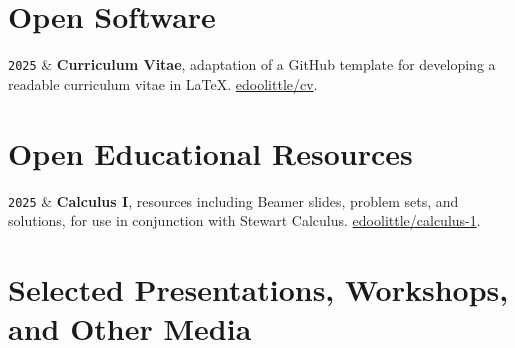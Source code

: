 \documentclass[9pt,a4paper]{article}
\newcommand{\Year}[1]{\fontsize{10pt}{0}\selectfont \texttt{#1}}
\newcommand{\GitHub}[1]{\faGithub{} \href{https://github.com/#1}{#1}}
\begin{document}
\section{Open Software}

\begin{EntriesTableYear}
  \Year{2025} & \textbf{Curriculum Vitae}, adaptation of a GitHub
  template for developing a readable curriculum vitae in \LaTeX.
  \GitHub{edoolittle/cv}.
\end{EntriesTableYear}

\section{Open Educational Resources}

\begin{EntriesTableYear}
  \Year{2025} & \textbf{Calculus I}, resources including Beamer
  slides, problem sets, and solutions, for use in conjunction with
  Stewart Calculus.  \GitHub{edoolittle/calculus-1}.
\end{EntriesTableYear}

\section{Selected Presentations, Workshops, and Other Media}
\end{document}
